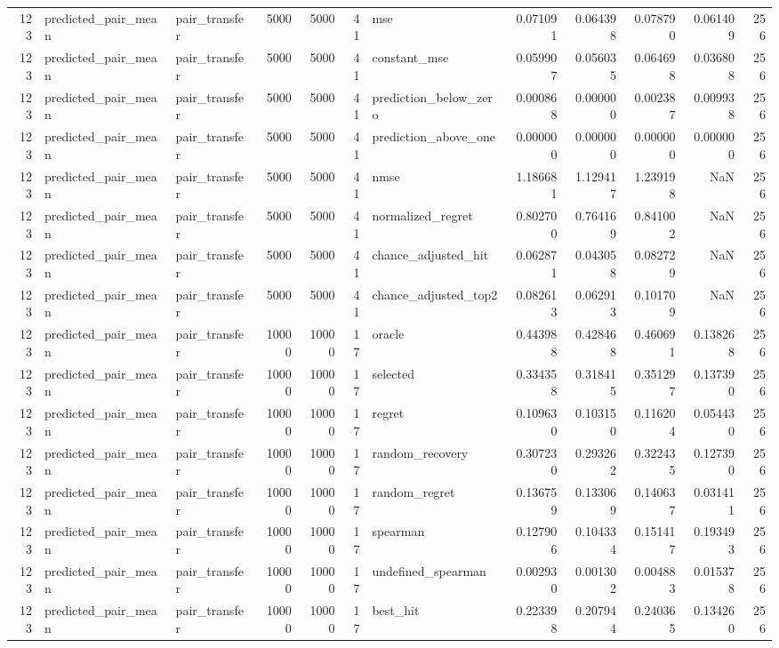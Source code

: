 \begin{tabular}{rllrrrlrrrrr}
123 & predicted_pair_mean & pair_transfer & 5000 & 5000 & 41 & mse & 0.071091 & 0.064398 & 0.078790 & 0.061409 & 256 \\
123 & predicted_pair_mean & pair_transfer & 5000 & 5000 & 41 & constant_mse & 0.059907 & 0.056035 & 0.064698 & 0.036808 & 256 \\
123 & predicted_pair_mean & pair_transfer & 5000 & 5000 & 41 & prediction_below_zero & 0.000868 & 0.000000 & 0.002387 & 0.009938 & 256 \\
123 & predicted_pair_mean & pair_transfer & 5000 & 5000 & 41 & prediction_above_one & 0.000000 & 0.000000 & 0.000000 & 0.000000 & 256 \\
123 & predicted_pair_mean & pair_transfer & 5000 & 5000 & 41 & nmse & 1.186681 & 1.129417 & 1.239198 & NaN & 256 \\
123 & predicted_pair_mean & pair_transfer & 5000 & 5000 & 41 & normalized_regret & 0.802700 & 0.764169 & 0.841002 & NaN & 256 \\
123 & predicted_pair_mean & pair_transfer & 5000 & 5000 & 41 & chance_adjusted_hit & 0.062871 & 0.043058 & 0.082729 & NaN & 256 \\
123 & predicted_pair_mean & pair_transfer & 5000 & 5000 & 41 & chance_adjusted_top2 & 0.082613 & 0.062913 & 0.101709 & NaN & 256 \\
123 & predicted_pair_mean & pair_transfer & 10000 & 10000 & 17 & oracle & 0.443988 & 0.428468 & 0.460691 & 0.138268 & 256 \\
123 & predicted_pair_mean & pair_transfer & 10000 & 10000 & 17 & selected & 0.334358 & 0.318415 & 0.351297 & 0.137390 & 256 \\
123 & predicted_pair_mean & pair_transfer & 10000 & 10000 & 17 & regret & 0.109630 & 0.103150 & 0.116204 & 0.054430 & 256 \\
123 & predicted_pair_mean & pair_transfer & 10000 & 10000 & 17 & random_recovery & 0.307230 & 0.293262 & 0.322435 & 0.127390 & 256 \\
123 & predicted_pair_mean & pair_transfer & 10000 & 10000 & 17 & random_regret & 0.136759 & 0.133069 & 0.140637 & 0.031411 & 256 \\
123 & predicted_pair_mean & pair_transfer & 10000 & 10000 & 17 & spearman & 0.127906 & 0.104334 & 0.151417 & 0.193493 & 256 \\
123 & predicted_pair_mean & pair_transfer & 10000 & 10000 & 17 & undefined_spearman & 0.002930 & 0.001302 & 0.004883 & 0.015378 & 256 \\
123 & predicted_pair_mean & pair_transfer & 10000 & 10000 & 17 & best_hit & 0.223398 & 0.207944 & 0.240365 & 0.134260 & 256 \\

\end{tabular}

